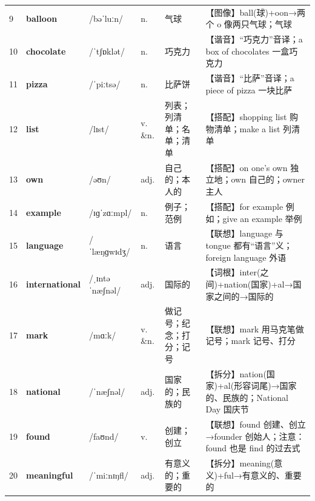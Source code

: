 \documentclass[UTF8,a4paper,11pt,oneside]{ctexbook}
\newcommand{\cellword}[1]{{\bfseries\textcolor{wordcol}{#1}}}
\newcommand{\cellipa}[1]{{\footnotesize\textcolor{ipacol}{#1}}}
\newcommand{\cellpos}[1]{\textcolor{poscol}{#1}}
\newcommand{\cellno}[1]{\textcolor{volcolor!75!black}{#1}}
\begin{document}
{\begin{longtable}{@{}C{0.045\textwidth}L{0.155\textwidth}L{0.175\textwidth}C{0.070\textwidth}L{0.180\textwidth}L{0.282\textwidth}@{}}
 \cellno{9} & \cellword{balloon} & \cellipa{/bəˈluːn/} & \cellpos{n.} & 气球 & \textcolor{tagImage}{【图像】}ball(球)+oon→\allowbreak{}两个 o 像两只气球；气球 \\
\cellno{10} & \cellword{chocolate} & \cellipa{/ˈtʃɒklət/} & \cellpos{n.} & 巧克力 & \textcolor{tagSound}{【谐音】}“巧克力”音译；a box of chocolates 一盒巧克力 \\
 \cellno{11} & \cellword{pizza} & \cellipa{/ˈpiːtsə/} & \cellpos{n.} & 比萨饼 & \textcolor{tagSound}{【谐音】}“比萨”音译；a piece of pizza 一块比萨 \\
\cellno{12} & \cellword{list} & \cellipa{/lɪst/} & \cellpos{v. \&n.} & 列表；列清单；名单；清单 & \textcolor{tagColloc}{【搭配】}shopping list 购物清单；make a list 列清单 \\
 \cellno{13} & \cellword{own} & \cellipa{/əʊn/} & \cellpos{adj.} & 自己的；本人的 & \textcolor{tagColloc}{【搭配】}on one's own 独立地；own 自己的；owner 主人 \\
\cellno{14} & \cellword{example} & \cellipa{/ɪɡˈzɑːmpl/} & \cellpos{n.} & 例子；范例 & \textcolor{tagColloc}{【搭配】}for example 例如；give an example 举例 \\
 \cellno{15} & \cellword{language} & \cellipa{/ˈlæŋɡwɪdʒ/} & \cellpos{n.} & 语言 & \textcolor{tagAssoc}{【联想】}language 与 tongue 都有“语言”义；foreign language 外语 \\
\cellno{16} & \cellword{international} & \cellipa{/ˌɪntəˈnæʃnəl/} & \cellpos{adj.} & 国际的 & \textcolor{tagRoot}{【词根】}inter(之间)+nation(国家)+al→\allowbreak{}国家之间的→\allowbreak{}国际的 \\
 \cellno{17} & \cellword{mark} & \cellipa{/mɑːk/} & \cellpos{v. \&n.} & 做记号；纪念；打分；记号 & \textcolor{tagAssoc}{【联想】}mark 用马克笔做记号；mark 记号、打分 \\
\cellno{18} & \cellword{national} & \cellipa{/ˈnæʃnəl/} & \cellpos{adj.} & 国家的；民族的 & \textcolor{tagSplit}{【拆分】}nation(国家)+al(形容词尾)→\allowbreak{}国家的、民族的；National Day 国庆节 \\
 \cellno{19} & \cellword{found} & \cellipa{/faʊnd/} & \cellpos{v.} & 创建；创立 & \textcolor{tagAssoc}{【联想】}found 创建、创立→\allowbreak{}founder 创始人；注意：found 也是 find 的过去式 \\
\cellno{20} & \cellword{meaningful} & \cellipa{/ˈmiːnɪŋfl/} & \cellpos{adj.} & 有意义的；重要的 & \textcolor{tagSplit}{【拆分】}meaning(意义)+ful→\allowbreak{}有意义的、重要的 \\

\end{longtable}}
\end{document}
